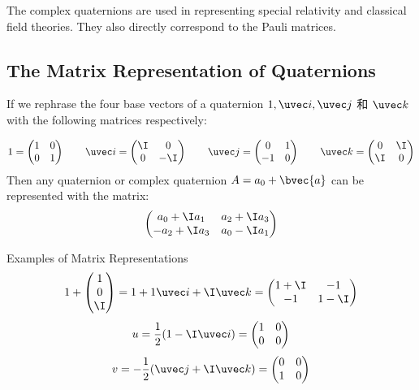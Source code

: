 The complex quaternions are used in representing special relativity and classical field theories. They also directly correspond to the Pauli matrices. 


\subsection{The Matrix Representation of Quaternions}

If we rephrase the four base vectors of a quaternion $1, \uvec i, \uvec j$ 和 $\uvec k$ with the following matrices respectively: 

\begin{equation}
1=\begin{pmatrix}1&0\\0&1\end{pmatrix} 
\qquad
\uvec i=\begin{pmatrix}\I&0\\0&-\I\end{pmatrix} 
\qquad
\uvec j=\begin{pmatrix}0&1\\-1&0\end{pmatrix} 
\qquad
\uvec k=\begin{pmatrix}0&\I\\\I&0\end{pmatrix} 
\end{equation}
Then any quaternion or complex quaternion $A=a_0+\bvec{a}$ can be represented with the matrix: 
\begin{equation}
\begin{pmatrix}a_0+\I a_1&a_2+\I a_3\\-a_2+\I a_3&a_0-\I a_1 \end{pmatrix} 
\end{equation}

\begin{example}{Examples of Matrix Representations}\label{QuaRot_ex1}
\begin{equation}
1+\begin{pmatrix}1\\0\\\I\end{pmatrix} =1+1\uvec i+\I\uvec k =\begin{pmatrix}1+\I&-1\\-1&1-\I\end{pmatrix} 
\end{equation}
\begin{equation}
u=\frac{1}{2}(1-\I\uvec i)=\begin{pmatrix}1&0\\0&0\end{pmatrix} 
\end{equation}
\begin{equation}
v=-\frac{1}{2}(\uvec j+\I\uvec k)=\begin{pmatrix}0&0\\1&0\end{pmatrix} 
\end{equation}
\end{example}

